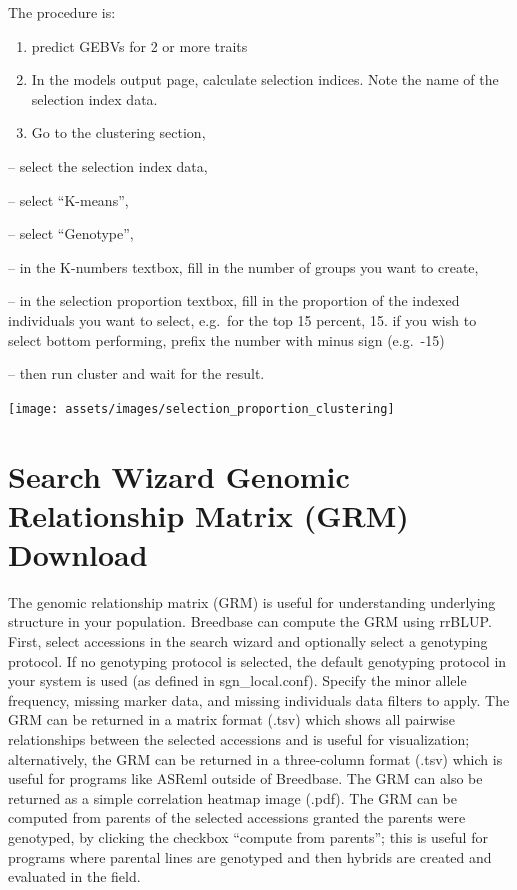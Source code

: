 \documentclass[
  12pt,
]{book}
\begin{document}
The procedure is:

\begin{enumerate}
\def\labelenumi{(\arabic{enumi})}
\item
  predict GEBVs for 2 or more traits
\item
  In the models output page, calculate selection indices. Note the name of the selection index data.
\item
  Go to the clustering section,
\end{enumerate}

-- select the selection index data,

-- select ``K-means'',

-- select ``Genotype'',

-- in the K-numbers textbox, fill in the number of groups you want to create,

-- in the selection proportion textbox, fill in the proportion of the indexed individuals you want to select, e.g.~for the top 15 percent, 15. if you wish to select bottom performing, prefix the number with minus sign (e.g.~-15)

-- then run cluster and wait for the result.

\begin{center}\texttt{[image: assets/images/selection\_proportion\_clustering]} \end{center}

\hypertarget{search-wizard-genomic-relationship-matrix-grm-download}{%
\section{Search Wizard Genomic Relationship Matrix (GRM) Download}\label{search-wizard-genomic-relationship-matrix-grm-download}}

The genomic relationship matrix (GRM) is useful for understanding underlying structure in your population. Breedbase can compute the GRM using rrBLUP. First, select accessions in the search wizard and optionally select a genotyping protocol. If no genotyping protocol is selected, the default genotyping protocol in your system is used (as defined in sgn\_local.conf). Specify the minor allele frequency, missing marker data, and missing individuals data filters to apply. The GRM can be returned in a matrix format (.tsv) which shows all pairwise relationships between the selected accessions and is useful for visualization; alternatively, the GRM can be returned in a three-column format (.tsv) which is useful for programs like ASReml outside of Breedbase. The GRM can also be returned as a simple correlation heatmap image (.pdf). The GRM can be computed from parents of the selected accessions granted the parents were genotyped, by clicking the checkbox ``compute from parents''; this is useful for programs where parental lines are genotyped and then hybrids are created and evaluated in the field.
\end{document}

